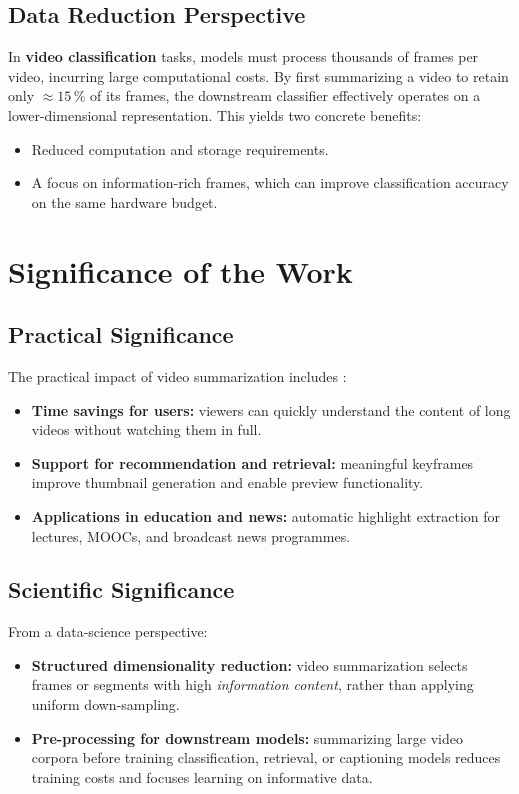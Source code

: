 \documentclass[12pt, a4paper]{report}
\begin{document}
\subsection{Data Reduction Perspective}
In \textbf{video classification} tasks, models must process thousands of frames per
video, incurring large computational costs. By first summarizing a video to retain
only $\approx 15\,\%$ of its frames, the downstream classifier effectively operates on
a lower-dimensional representation. This yields two concrete benefits:
\begin{itemize}
  \item Reduced computation and storage requirements.
  \item A focus on information-rich frames, which can improve classification accuracy
        on the same hardware budget.
\end{itemize}

\section{Significance of the Work}

\subsection{Practical Significance}
The practical impact of video summarization includes \cite{kadam2022}:
\begin{itemize}
  \item \textbf{Time savings for users:} viewers can quickly understand the content
        of long videos without watching them in full.
  \item \textbf{Support for recommendation and retrieval:} meaningful keyframes improve
        thumbnail generation and enable preview functionality.
  \item \textbf{Applications in education and news:} automatic highlight extraction
        for lectures, MOOCs, and broadcast news programmes.
\end{itemize}

\subsection{Scientific Significance}
From a data-science perspective:
\begin{itemize}
  \item \textbf{Structured dimensionality reduction:} video summarization selects
        frames or segments with high \emph{information content}, rather than applying
        uniform down-sampling.
  \item \textbf{Pre-processing for downstream models:} summarizing large video corpora
        before training classification, retrieval, or captioning models reduces
        training costs and focuses learning on informative data.
\end{itemize}
\end{document}
